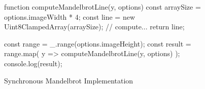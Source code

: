 \begin{figure}
	
	\begin{javascriptcode}
function computeMandelbrotLine(y, options) {
	const arraySize = options.imageWidth * 4;
	const line = new Uint8ClampedArray(arraySize);
	// compute...
	return line;
}

const range = _.range(options.imageHeight);
const result = range.map(
	y => computeMandelbrotLine(y, options)
);
console.log(result);
\end{javascriptcode}
\caption{Synchronous Mandelbrot Implementation}
\label{fig:mandelbrot-sync}
\end{figure}

